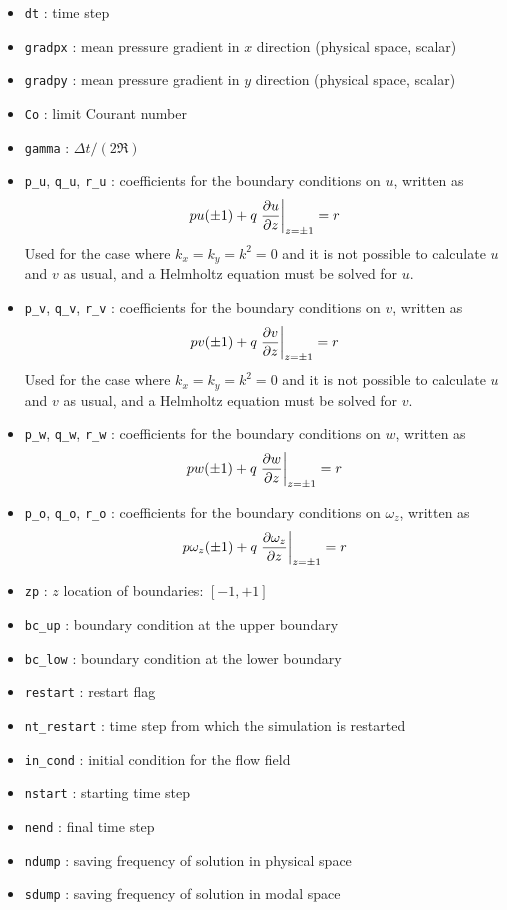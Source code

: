 \begin{itemize}
\begin{itemize}
\item \texttt{dt} : time step
\item \texttt{gradpx} : mean pressure gradient in $x$ direction (physical space, scalar)
\item \texttt{gradpy} : mean pressure gradient in $y$ direction (physical space, scalar)
\item \texttt{Co} : limit Courant number
\item \texttt{gamma} : $\Delta t/(2\Re)$
\item \texttt{p\_u}, \texttt{q\_u}, \texttt{r\_u} : coefficients for the boundary conditions on $u$, written as 
\[pu(\pm1)+q\left.\frac{\partial u}{\partial z}\right|_{z=\pm1}=r\]
Used for the case where $k_x=k_y=k^2=0$ and it is not possible to calculate $u$ and $v$ as usual, and a Helmholtz equation must be solved for $u$.
\item \texttt{p\_v}, \texttt{q\_v}, \texttt{r\_v} : coefficients for the boundary conditions on $v$, written as 
\[pv(\pm1)+q\left.\frac{\partial v}{\partial z}\right|_{z=\pm1}=r\]
Used for the case where $k_x=k_y=k^2=0$ and it is not possible to calculate $u$ and $v$ as usual, and a Helmholtz equation must be solved for $v$.
\item \texttt{p\_w}, \texttt{q\_w}, \texttt{r\_w} : coefficients for the boundary conditions on $w$, written as 
\[pw(\pm1)+q\left.\frac{\partial w}{\partial z}\right|_{z=\pm1}=r\]
\item \texttt{p\_o}, \texttt{q\_o}, \texttt{r\_o} : coefficients for the boundary conditions on $\omega_z$, written as 
\[p\omega_z(\pm1)+q\left.\frac{\partial \omega_z}{\partial z}\right|_{z=\pm1}=r\]
\item \texttt{zp} : $z$ location of boundaries: $[-1,+1]$
\item \texttt{bc\_up} : boundary condition at the upper boundary
\item \texttt{bc\_low} : boundary condition at the lower boundary
\item \texttt{restart} : restart flag
\item \texttt{nt\_restart} : time step from which the simulation is restarted
\item \texttt{in\_cond} : initial condition for the flow field
\item \texttt{nstart} : starting time step
\item \texttt{nend} : final time step
\item \texttt{ndump} : saving frequency of solution in physical space
\item \texttt{sdump} : saving frequency of solution in modal space

\end{itemize}
\end{itemize}
